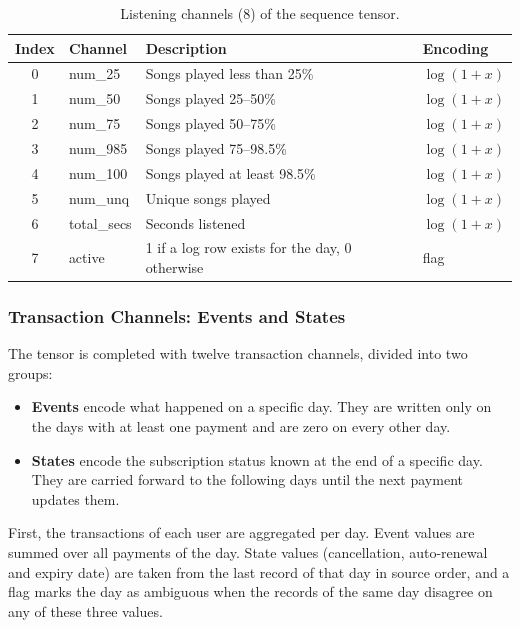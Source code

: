 \documentclass{article}
\begin{document}
\begin{table}[H]
\centering
\renewcommand{\arraystretch}{1.3}
\begin{tabularx}{\textwidth}{|c|l|X|l|}
\hline
\textbf{Index} & \textbf{Channel} & \textbf{Description} & \textbf{Encoding} \\ \hline
0 & num\_25     & Songs played less than 25\% & $\log(1+x)$ \\ \hline
1 & num\_50     & Songs played 25--50\%       & $\log(1+x)$ \\ \hline
2 & num\_75     & Songs played 50--75\%       & $\log(1+x)$ \\ \hline
3 & num\_985    & Songs played 75--98.5\%     & $\log(1+x)$ \\ \hline
4 & num\_100    & Songs played at least 98.5\% & $\log(1+x)$ \\ \hline
5 & num\_unq    & Unique songs played         & $\log(1+x)$ \\ \hline
6 & total\_secs & Seconds listened            & $\log(1+x)$ \\ \hline
7 & active      & 1 if a log row exists for the day, 0 otherwise & flag \\ \hline
\end{tabularx}
\caption{Listening channels (8) of the sequence tensor.}
\label{tab:w2_listening}
\end{table}

\subsubsection{Transaction Channels: Events and States}

The tensor is completed with twelve transaction channels, divided into two groups:

\begin{itemize}
    \item \textbf{Events} encode what happened on a specific day. They are written only on the days with at least one payment and are zero on every other day.
    \item \textbf{States} encode the subscription status known at the end of a specific day. They are carried forward to the following days until the next payment updates them.
\end{itemize}

First, the transactions of each user are aggregated per day. Event values are summed over all payments of the day. State values (cancellation, auto-renewal and expiry date) are taken from the last record of that day in source order, and a flag marks the day as ambiguous when the records of the same day disagree on any of these three values.
\end{document}
